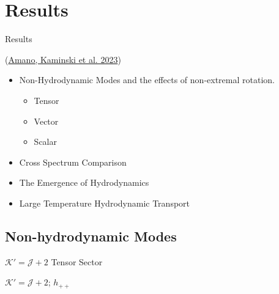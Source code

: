 \documentclass[aspectratio=169, xcolor=dvipsnames]{beamer}
\begin{document}
\section{Results}

\begin{frame}{Results}

  (\href{https://arxiv.org/abs/2308.11686}{Amano, Kaminski et al. 2023})

  \begin{itemize}
    \item Non-Hydrodynamic Modes and the effects of non-extremal rotation.
      \begin{itemize}
        \item Tensor
        \item Vector
        \item Scalar
      \end{itemize}
    \item Cross Spectrum Comparison
    \item The Emergence of Hydrodynamics
    \item Large Temperature Hydrodynamic Transport
  \end{itemize}
\end{frame}

\subsection{Non-hydrodynamic Modes}

\begin{frame}{\(\mathcal K' = \mathcal J + 2\) Tensor Sector}
  \begin{center}
  \end{center}

  \(\mathcal K' = \mathcal J + 2\); \(h_{++}\)
\end{frame}
\end{document}
